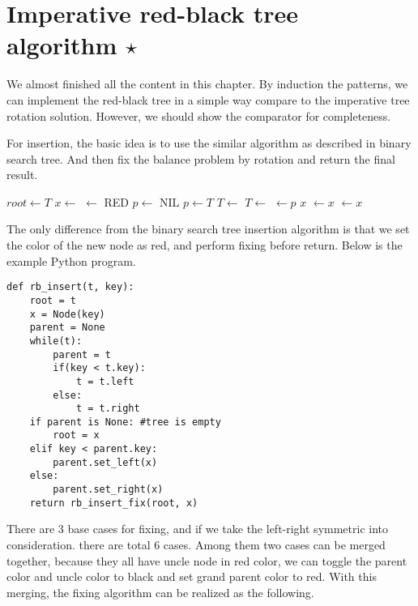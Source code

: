 \documentclass[b5paper]{article}
\begin{document}
\section{Imperative red-black tree algorithm $\star$}

We almost finished all the content in this chapter. By induction
the patterns, we can implement the red-black tree in a simple way
compare to the imperative tree rotation solution. However, we
should show the comparator for completeness.

For insertion, the basic idea is to use the similar algorithm
as described in binary search tree. And then fix the balance
problem by rotation and return the final result.

\begin{algorithmic}[1]
  \State $root \gets T$
  \State $x \gets$ 
  \State {} $\gets$ RED
  \State $p \gets$ NIL
    \State $p \gets T$
      \State $T \gets $ 
    \Else
      \State $T \gets $ 
    \EndIf
  \EndWhile
  \State {} $\gets p$
   
    \State \Return $x$
    \State {} $\gets x$
  \Else
    \State {} $\gets x$
  \EndIf
  \State \Return {}
\EndFunction
\end{algorithmic}

The only difference from the binary search tree insertion algorithm
is that we set the color of the new node as red, and perform fixing
before return. Below is the example Python program.

\lstset{language=Python}
\begin{lstlisting}
def rb_insert(t, key):
    root = t
    x = Node(key)
    parent = None
    while(t):
        parent = t
        if(key < t.key):
            t = t.left
        else:
            t = t.right
    if parent is None: #tree is empty
        root = x
    elif key < parent.key:
        parent.set_left(x)
    else:
        parent.set_right(x)
    return rb_insert_fix(root, x)
\end{lstlisting}

There are 3 base cases for fixing, and if we take the left-right
symmetric into consideration. there are total 6 cases.
Among them two cases can be merged together, because they all have
uncle node in red color, we can toggle the parent color and
uncle color to black and set grand parent color to red.
With this merging, the fixing algorithm can be realized as the following.
\end{document}
